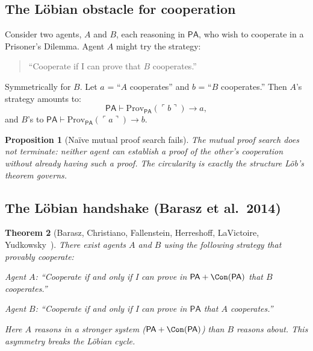 \documentclass[11pt,a4paper]{article}
\newtheorem{theorem}{Theorem}[section]
\newtheorem{proposition}[theorem]{Proposition}
\theoremstyle{definition}
\theoremstyle{remark}
\newcommand{\PA}{\mathsf{PA}}
\newcommand{\Prov}{\mathrm{Prov}}
\begin{document}
\subsection{The L\"obian obstacle for cooperation}

Consider two agents, $A$ and $B$, each reasoning in $\PA$, who wish to
cooperate in a Prisoner's Dilemma.  Agent $A$ might try the strategy:
\begin{quote}
``Cooperate if I can prove that $B$ cooperates.''
\end{quote}
Symmetrically for $B$.  Let $a$ = ``$A$ cooperates'' and $b$ = ``$B$
cooperates.''  Then $A$'s strategy amounts to:
\[
  \PA \vdash \Prov_\PA(\ulcorner b \urcorner) \to a,
\]
and $B$'s to $\PA \vdash \Prov_\PA(\ulcorner a \urcorner) \to b$.

\begin{proposition}[Na\"ive mutual proof search fails]
The mutual proof search does not terminate: neither agent can establish
a proof of the other's cooperation without already having such a proof.
The circularity is exactly the structure L\"ob's theorem governs.
\end{proposition}

\subsection{The L\"obian handshake (Barasz et al.\ 2014)}

\begin{theorem}[Barasz, Christiano, Fallenstein, Herreshoff, LaVictoire, Yudkowsky~\cite{barasz2014robust}]
There exist agents $A$ and $B$ using the following strategy that
provably cooperate:

Agent $A$: ``Cooperate if and only if I can prove in $\PA + \Con(\PA)$
that $B$ cooperates.''

Agent $B$: ``Cooperate if and only if I can prove in $\PA$ that $A$
cooperates.''

\medskip\noindent
Here $A$ reasons in a \emph{stronger} system ($\PA + \Con(\PA)$) than
$B$ reasons about.  This asymmetry breaks the L\"obian cycle.
\end{theorem}
\end{document}
